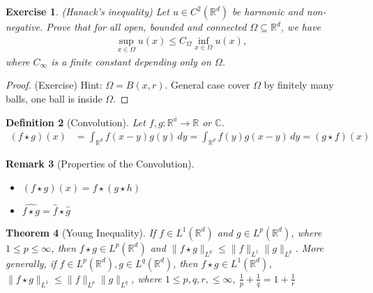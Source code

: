 \documentclass{report}
\theoremstyle{tommy}
\newtheorem{defn}{Definition}
\newtheorem{thm}[defn]{Theorem}
\newtheorem{rem}[defn]{Remark}
\newtheorem{ex}[defn]{Exercise}
\begin{document}
\begin{ex} (Hanack's inequality)
  Let \(u \in C^2(\mathbb{R}^d)\) be harmonic and non-negative. Prove that for all open, bounded and connected \(\Omega \subseteq \mathbb{R}^d\), we have
  \begin{align*}
    \sup_{x \in \Omega} u(x) \le C_\Omega \inf_{x \in \Omega} u(x),
  \end{align*}
  where \(C_\infty\) is a finite constant depending only on \(\Omega\).
\end{ex}

\begin{proof} (Exercise)
  Hint: \(\Omega = B(x,r)\). General case cover \(\Omega\) by finitely many balls, one ball is inside \(\Omega\).
\end{proof}


\begin{defn}[Convolution]
  Let \(f, g: \mathbb{{R}^d \to \mathbb{R}}\) or \(\mathbb{C}\).
  \begin{align*}
    (f \star g)(x)
    &= \int_{\mathbb{R}^d} f(x-y) g(y) \, dy
    = \int_{\mathbb{R}^d} f(y) g(x-y) \, dy 
    = (g \star f)(x)
  \end{align*}
\end{defn}

\begin{rem}[Properties of the Convolution]
  \begin{itemize}
    \item \((f \star g)(x) = f \star (g \star h)\)
    \item \(\hat{f \star g} = \hat f \star \hat g\)
  \end{itemize}
\end{rem}


\begin{thm}[Young Inequality]
  If \(f \in L^1(\mathbb{R}^d)\) and \(g \in L^p(\mathbb{R}^d)\), where \(1 \le p \le \infty\), then \(f \star g \in L^p(\mathbb{R}^d)\) and \(\|f \star g \|_{L^p} \le \|f\|_{L^1} \|g\|_{L^p}\). More generally, if \(f \in L^p(\mathbb{R}^d), g \in L^q(\mathbb{R}^d)\), then \(f \star g \in L^1(\mathbb{R}^d)\), \(\| f \star g\|_{L^1} \le \|f\|_{L^p} \|g\|_{L^q}\), where \(1 \le p, q, r, \le \infty\), \(\frac{1}{p} + \frac{1}{q} = 1 + \frac{1}{r}\)
\end{thm}
\end{document}
